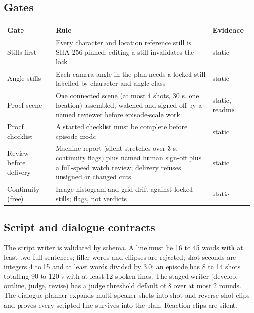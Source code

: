 \documentclass[11pt,a4paper]{article}
\begin{document}
\subsection{Gates}
\begin{longtable}{@{}P{2.8cm}P{10.2cm}P{2.5cm}@{}}
\toprule \textbf{Gate} & \textbf{Rule} & \textbf{Evidence}\\ \midrule\endhead
Stills first & Every character and location reference still is SHA-256 pinned; editing a still invalidates the lock & static\\
Angle stills & Each camera angle in the plan needs a locked still labelled by character and angle class & static\\
Proof scene & One connected scene (at most 4 shots, 30 s, one location) assembled, watched and signed off by a named reviewer before episode-scale work & static, readme\\
Proof checklist & A started checklist must be complete before episode mode & static\\
Review before delivery & Machine report (silent stretches over 3 s, continuity flags) plus named human sign-off plus a full-speed watch review; delivery refuses unsigned or changed cuts & static\\
Continuity (free) & Image-histogram and grid drift against locked stills; flags, not verdicts & static\\
\bottomrule
\end{longtable}

\subsection{Script and dialogue contracts}
The script writer is validated by schema. A line must be 16 to 45 words with at least two full sentences; filler words and ellipses are rejected; shot seconds are integers 4 to 15 and at least words divided by 3.0; an episode has 8 to 14 shots totalling 90 to 120 s with at least 12 spoken lines. The staged writer (develop, outline, judge, revise) has a judge threshold default of 8 over at most 2 rounds. The dialogue planner expands multi-speaker shots into shot and reverse-shot clips and proves every scripted line survives into the plan. Reaction clips are silent.
\end{document}
